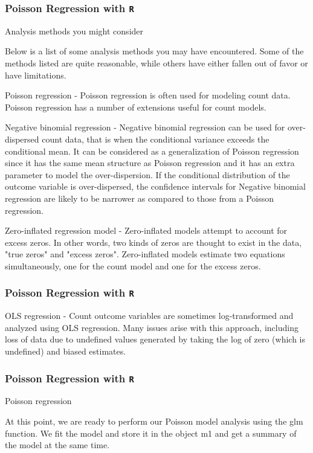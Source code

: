 \begin{frame}[fragile]

\frametitle{Poisson Regression with \texttt{R}}
\Large


Analysis methods you might consider

Below is a list of some analysis methods you may have encountered. Some of the methods listed are quite reasonable, while others have either fallen out of favor or have limitations.
 \item Poisson regression - Poisson regression is often used for modeling count data. Poisson regression has a number of extensions useful for count models.
\item Negative binomial regression - Negative binomial regression can be used for over-dispersed count data, that is when the conditional variance exceeds the conditional mean. It can be considered as a generalization of Poisson regression since it has the same mean structure as Poisson regression and it has an extra parameter to model the over-dispersion. If the conditional distribution of the outcome variable is over-dispersed, the confidence intervals for Negative binomial regression are likely to be narrower as compared to those from a Poisson regression.
\item Zero-inflated regression model - Zero-inflated models attempt to account for excess zeros. In other words, two kinds of zeros are thought to exist in the data, "true zeros" and "excess zeros". Zero-inflated models estimate two equations simultaneously, one for the count model and one for the excess zeros.
\end{frame}

\begin{frame}[fragile]

\frametitle{Poisson Regression with \texttt{R}}
\Large


\item OLS regression - Count outcome variables are sometimes log-transformed and analyzed using OLS regression. Many issues arise with this approach, including loss of data due to undefined values generated by taking the log of zero (which is undefined) and biased estimates.
\end{frame}

\begin{frame}[fragile]

\frametitle{Poisson Regression with \texttt{R}}
\Large
 
Poisson regression
 
At this point, we are ready to perform our Poisson model analysis using the glm function. We fit the model and store it in the object m1 and get a summary of the model at the same time.

\end{frame}

